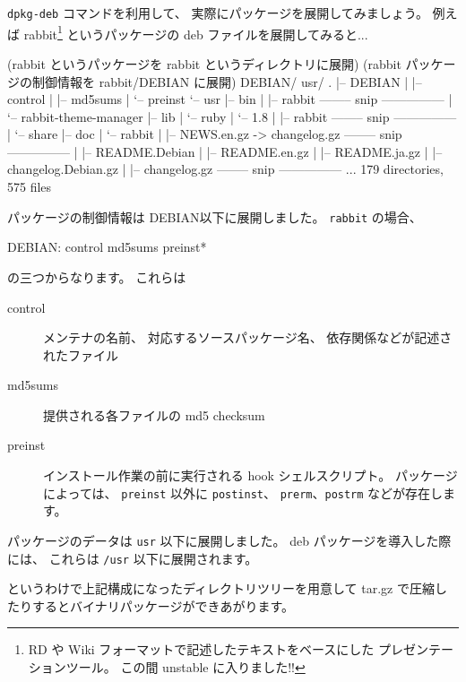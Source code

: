 \documentclass[mingoth,a4paper]{jsarticle}
\begin{document}
{\tt dpkg-deb} コマンドを利用して、 実際にパッケージを展開してみましょう。
%
例えば rabbit\footnote{%
RD や Wiki フォーマットで記述したテキストをベースにした
プレゼンテーションツール。 この間 unstable に入りました!!} 
%
というパッケージの deb ファイルを展開してみると...
\begin{commandline}
                 (rabbit というパッケージを rabbit というディレクトリに展開)
                 (rabbit パッケージの制御情報を rabbit/DEBIAN に展開)
  DEBIAN/  usr/
  .
  |-- DEBIAN
  |   |-- control
  |   |-- md5sums
  |   `-- preinst
  `-- usr
      |-- bin
      |   |-- rabbit
-------- snip ---------------
      |   `-- rabbit-theme-manager
      |-- lib
      |   `-- ruby
      |       `-- 1.8
      |           |-- rabbit
-------- snip ---------------
      |         
      `-- share
          |-- doc
          |   `-- rabbit
          |       |-- NEWS.en.gz -> changelog.gz
-------- snip ---------------
          |       |-- README.Debian
          |       |-- README.en.gz
          |       |-- README.ja.gz
          |       |-- changelog.Debian.gz
          |       |-- changelog.gz
-------- snip ---------------
          ...
179 directories, 575 files
\end{commandline}
パッケージの制御情報は DEBIAN以下に展開しました。 
{\tt rabbit} の場合、 
\begin{commandline}
  DEBIAN:
  control  md5sums  preinst*
\end{commandline}
の三つからなります。 これらは
\begin{description}
      \item[control] 
    メンテナの名前、 
    対応するソースパッケージ名、 依存関係などが記述されたファイル
      \item[md5sums]
    提供される各ファイルの md5 checksum
      \item[preinst]
    インストール作業の前に実行される hook シェルスクリプト。
    パッケージによっては、 
    {\tt preinst} 以外に
    {\tt postinst}、 {\tt prerm}、{\tt postrm} などが存在します。
\end{description}


パッケージのデータは {\tt usr} 以下に展開しました。
%
deb パッケージを導入した際には、 これらは {\tt /usr} 以下に展開されます。

というわけで上記構成になったディレクトリツリーを用意して
tar.gz で圧縮したりするとバイナリパッケージができあがります。
\end{document}
